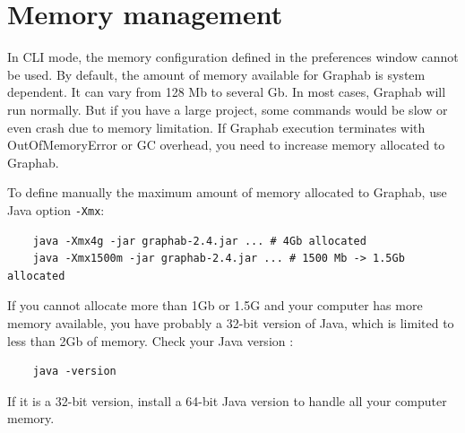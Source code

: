 \documentclass[a4paper,10pt]{report}
\begin{document}
\section{Memory management}
In CLI mode, the memory configuration defined in the preferences window cannot be used.
By default, the amount of memory available for Graphab is system dependent. It can vary from 128 Mb to several Gb.
In most cases, Graphab will run normally. But if you have a large project, some commands would be slow or even crash due to memory limitation.
If Graphab execution terminates with OutOfMemoryError or GC overhead, you need to increase memory allocated to Graphab.

To define manually the maximum amount of memory allocated to Graphab, use Java option \verb|-Xmx|:
\begin{Verbatim}
	java -Xmx4g -jar graphab-2.4.jar ... # 4Gb allocated
	java -Xmx1500m -jar graphab-2.4.jar ... # 1500 Mb -> 1.5Gb allocated
\end{Verbatim}
If you cannot allocate more than 1Gb or 1.5G and your computer has more memory available, you have probably a
 32-bit version of Java, which is limited to less than 2Gb of memory.
Check your Java version :
\begin{Verbatim}
	java -version
\end{Verbatim}
If it is a 32-bit version, install a 64-bit Java version to handle all your computer memory.



\end{document}
